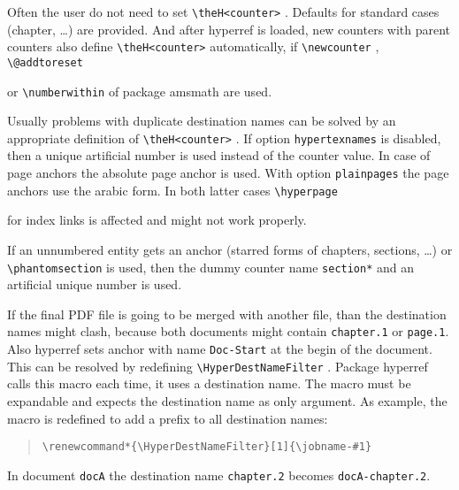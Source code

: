 \documentclass{article}
\newcommand*{\cs}[1]{%
  \texttt{\textbackslash #1}%
}
\newcommand*{\xpackage}[1]{\textsf{#1}}
\begin{document}
Often the user do not need to set \cs{theH<counter>}. Defaults
for standard cases (chapter, \dots) are provided. And after \xpackage{hyperref}
is loaded, new counters with parent counters also define
\cs{theH<counter>} automatically, if \cs{newcounter}, \cs{@addtoreset}
or \cs{numberwithin} of package \xpackage{amsmath} are used.

Usually problems with duplicate destination names can be solved
by an appropriate definition of \cs{theH<counter>}. If option
\texttt{hypertexnames} is disabled, then a unique artificial
number is used instead of the counter value. In case of page
anchors the absolute page anchor is used. With option \texttt{plainpages}
the page anchors use the arabic form. In both latter cases \cs{hyperpage}
for index links is affected and might not work properly.

If an unnumbered entity gets an anchor (starred forms of
chapters, sections, \dots) or \cs{phantomsection} is used,
then the dummy counter name \texttt{section*} and an artificial
unique number is used.

If the final PDF file is going to be merged with another file, than
the destination names might clash, because both documents might
contain \texttt{chapter.1} or \texttt{page.1}. Also \xpackage{hyperref}
sets anchor with name \texttt{Doc-Start} at the begin of the document.
This can be resolved by redefining \cs{HyperDestNameFilter}.
Package \xpackage{hyperref} calls this macro each time, it uses a
destination name.
The macro must be expandable and expects the destination name
as only argument. As example, the macro is redefined to add
a prefix to all destination names:
\begin{quote}
\begin{verbatim}
\renewcommand*{\HyperDestNameFilter}[1]{\jobname-#1}
\end{verbatim}
\end{quote}
In document \texttt{docA} the destination name \texttt{chapter.2}
becomes \texttt{docA-chapter.2}.
\end{document}

